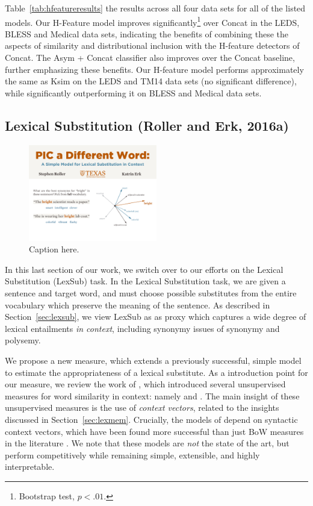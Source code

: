 \documentclass[12pt]{article}
\begin{document}
Table~\ref{tab:hfeatureresults} the results across all four data sets for all
of the listed models. Our H-Feature model improves
significantly\footnote{Bootstrap test, $p<.01$.} over Concat in the LEDS, BLESS
and Medical data sets, indicating the benefits of combining these the aspects
of similarity and distributional inclusion with the H-feature detectors of
Concat.  The Asym + Concat classifier also improves over the Concat baseline,
further emphasizing these benefits. Our H-feature model performs approximately
the same as Ksim on the LEDS and TM14 data sets (no significant difference),
while significantly outperforming it on BLESS and Medical data sets.



\subsection{Lexical Substitution (Roller and Erk, 2016a)}
\label{sec:pic}

\begin{figure}
  \centering
  \includegraphics[width=0.5\textwidth]{figures/substitution}
  \caption{Caption here.}
  \label{fig:substitution}
\end{figure}

In this last section of our work, we switch over to our efforts on the Lexical
Substitution (LexSub) task. In the Lexical Substitution task, we are given
a sentence and target word, and must choose possible substitutes from the
entire vocabulary which preserve the meaning of the sentence.
As described in Section~\ref{sec:lexsub}, we view
LexSub as as proxy which captures a wide degree of lexical entailments {\em in
context}, including synonymy issues of synonymy and polysemy. 

We propose a new measure, which extends
a previously successful, simple model to estimate the appropriateness of a
lexical substitute. As a introduction point for our measure, we review the work
of , which introduced several unsupervised measures
for word similarity in context: namely \balAddCos and \addCos. The main insight
of these unsupervised measures is the use of {\em context vectors}, related
to the insights discussed in Section~\ref{sec:lexmem}. Crucially, the models
of  depend on syntactic context vectors, which
have been found more successful than just BoW measures in the literature
.
We note that these models are {\em not} the state of the art,
\cite{melamud:2015:naacl,melamud:2016:conll} but perform competitively while
remaining simple, extensible, and highly interpretable.
\end{document}
